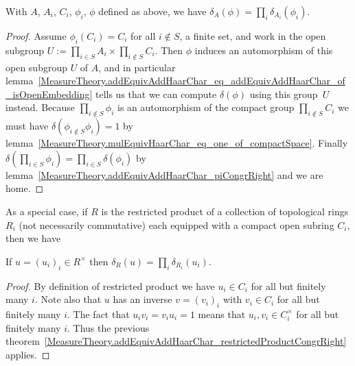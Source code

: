 \begin{theorem}
  \label{MeasureTheory.addEquivAddHaarChar_restrictedProductCongrRight}
  \leanok
  With $A$, $A_i$, $C_i$, $\phi_i$, $\phi$ defined as above, we have
  $\delta_A(\phi)=\prod_i\delta_{A_i}(\phi_i)$.
\end{theorem}
\begin{proof}
  Assume $\phi_i(C_i)=C_i$ for all $i\not\in S$, a finite set, and work in the
  open subgroup $U:=\prod_{i\in S}A_i\times\prod_{i\not\in S}C_i$. Then $\phi$ induces
  an automorphism of this open subgroup $U$ of $A$, and in particular
  lemma~\ref{MeasureTheory.addEquivAddHaarChar_eq_addEquivAddHaarChar_of_isOpenEmbedding} tells us
  that we can compute $\delta(\phi)$ using this group~$U$ instead.
  Because $\prod_{i\not\in S}\phi_i$ is an automorphism of the compact
  group $\prod_{i\not\in S}C_i$ we must have $\delta(\phi_{i\not\in S}\phi_i)=1$
  by lemma~\ref{MeasureTheory.mulEquivHaarChar_eq_one_of_compactSpace}. Finally
  $\delta(\prod_{i\in S}\phi_i)=\prod_{i\in S}\delta(\phi_i)$ by
  lemma~\ref{MeasureTheory.addEquivAddHaarChar_piCongrRight} and we are home.
\end{proof}

As a special case, if $R$ is the restricted product of a collection of topological rings $R_i$
  (not necessarily commutative) each equipped with a compact open subring $C_i$, then
  we have

\begin{corollary}
  \label{MeasureTheory.ringHaarChar_restrictedProduct}
  \leanok
  If $u=(u_i)_i\in R^\times$ then $\delta_R(u)=\prod_i\delta_{R_i}(u_i)$.
\end{corollary}
\begin{proof}
  By definition of restricted product we have $u_i\in C_i$ for all but finitely many $i$.
  Note also that $u$ has an inverse $v=(v_i)_i$ with $v_i\in C_i$ for all but finitely many $i$.
  The fact that $u_iv_i=v_iu_i=1$ means that $u_i,v_i\in C_i^\times$ for all but finitely many $i$.
  Thus the previous theorem~\ref{MeasureTheory.addEquivAddHaarChar_restrictedProductCongrRight} applies.
\end{proof}


